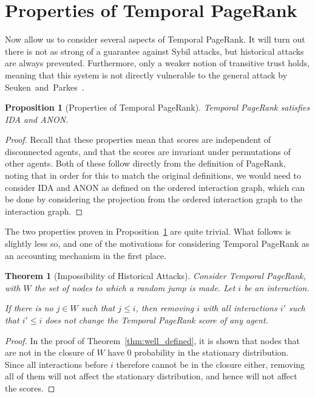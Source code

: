 \documentclass[a4paper,11pt]{book}
\newtheorem{theorem}{Theorem}
\newtheorem{proposition}{Proposition}
\theoremstyle{definition}
\begin{document}
\section{Properties of Temporal PageRank}

Now allow us to consider several aspects of Temporal PageRank. It will turn out there is
not as strong of a guarantee against Sybil attacks, but historical attacks are always prevented.
Furthermore, only a weaker notion of transitive trust holds, meaning that this system is not
directly vulnerable to the general attack by Seuken~and~Parkes~\cite{seuken2014sybil}.

\begin{proposition}[Properties of Temporal PageRank]
    Temporal PageRank satisfies IDA and ANON.
    \label{prop:prop_temp_pr}
\end{proposition}

\begin{proof}
    Recall that these properties mean that scores are independent of disconnected agents, and that
    the scores are invariant under permutations of other agents. Both of these follow directly
    from the definition of PageRank, noting that in order for this to match the original definitions,
    we would need to consider IDA and ANON as defined on the ordered interaction graph, which can
    be done by considering the projection from the ordered interaction graph to the interaction graph.
\end{proof}

The two properties proven in Proposition~\ref{prop:prop_temp_pr} are quite trivial. What follows
is slightly less so, and one of the motivations for considering Temporal PageRank as an accounting
mechanism in the first place.

\begin{theorem}[Impossibility of Historical Attacks]
    Consider Temporal PageRank, with $W$ the set of nodes to which a random jump is made. Let
    $i$ be an interaction.

    If there is no $j \in W$ such that $j \leq i$, then removing $i$ with all
    interactions $i'$ such that $i' \leq i$ does not change the Temporal PageRank
    score of any agent.
    \label{}
\end{theorem}

\begin{proof}
    In the proof of Theorem~\ref{thm:well_defined}, it is shown that nodes that are not in the closure
    of $W$ have $0$ probability in the stationary distribution. Since all interactions before $i$ therefore
    cannot be in the closure either, removing all of them will not affect the stationary distribution, and
    hence will not affect the scores.
\end{proof}
\end{document}
